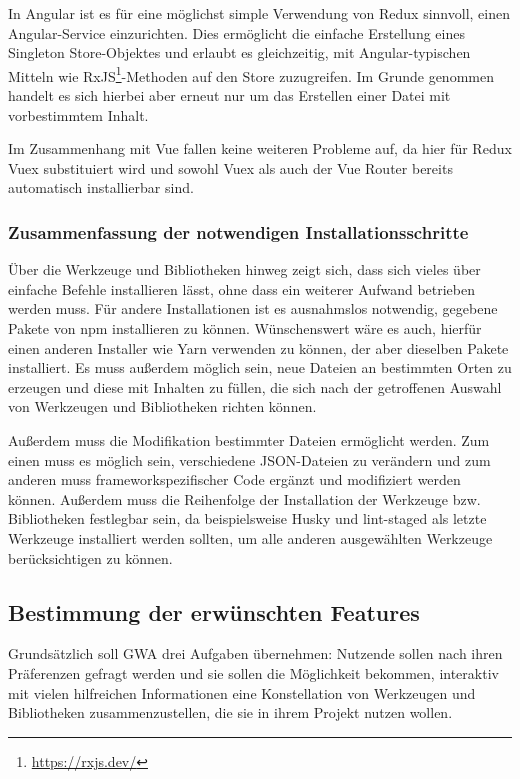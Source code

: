 In Angular ist es für eine möglichst simple Verwendung von Redux sinnvoll, einen Angular-Service einzurichten. Dies ermöglicht die einfache Erstellung eines Singleton Store-Objektes und erlaubt es gleichzeitig, mit Angular-typischen Mitteln wie RxJS\footnote{\url{https://rxjs.dev/}}-Methoden auf den Store zuzugreifen. Im Grunde genommen handelt es sich hierbei aber erneut nur um das Erstellen einer Datei mit vorbestimmtem Inhalt.

Im Zusammenhang mit Vue fallen keine weiteren Probleme auf, da hier für Redux Vuex substituiert wird und sowohl Vuex als auch der Vue Router bereits automatisch installierbar sind.

\subsubsection{Zusammenfassung der notwendigen Installationsschritte}
Über die Werkzeuge und Bibliotheken hinweg zeigt sich, dass sich vieles über einfache Befehle installieren lässt, ohne dass ein weiterer Aufwand betrieben werden muss. Für andere Installationen ist es ausnahmslos notwendig, gegebene Pakete von \gls{npm} installieren zu können. Wünschenswert wäre es auch, hierfür einen anderen Installer wie Yarn verwenden zu können, der aber dieselben Pakete installiert. Es muss außerdem möglich sein, neue Dateien an bestimmten Orten zu erzeugen und diese mit Inhalten zu füllen, die sich nach der getroffenen Auswahl von Werkzeugen und Bibliotheken richten können.

Außerdem muss die Modifikation bestimmter Dateien ermöglicht werden. Zum einen muss es möglich sein, verschiedene \gls{JSON}-Dateien zu verändern und zum anderen muss frameworkspezifischer Code ergänzt und modifiziert werden können. Außerdem muss die Reihenfolge der Installation der Werkzeuge bzw. Bibliotheken festlegbar sein, da beispielsweise Husky und lint-staged als letzte Werkzeuge installiert werden sollten, um alle anderen ausgewählten Werkzeuge berücksichtigen zu können.

\subsection{Bestimmung der erwünschten Features}
\label{konz:all_features}
Grundsätzlich soll \gls{GWA} drei Aufgaben übernehmen: Nutzende sollen nach ihren Präferenzen gefragt werden und sie sollen die Möglichkeit bekommen, interaktiv mit vielen hilfreichen Informationen eine Konstellation von Werkzeugen und Bibliotheken zusammenzustellen, die sie in ihrem Projekt nutzen wollen.

